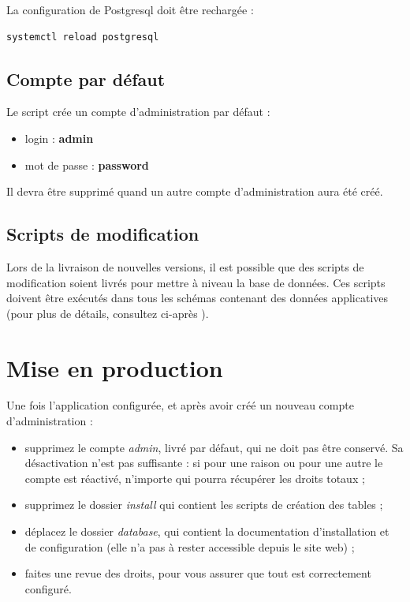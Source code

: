 La configuration de Postgresql doit être rechargée :
\begin{lstlisting}
systemctl reload postgresql
\end{lstlisting}

\subsection{Compte par défaut}
Le script crée un compte d'administration par défaut :
\begin{itemize}
\item login : \textbf{admin}
\item mot de passe : \textbf{password}
\end{itemize}

Il devra être supprimé quand un autre compte d'administration aura été créé.

\subsection{Scripts de modification}

Lors de la livraison de nouvelles versions, il est possible que des scripts de modification soient livrés pour mettre à niveau la base de données. Ces scripts doivent être exécutés dans tous les schémas contenant des données applicatives (pour plus de détails, consultez ci-après \textit{}).

\section{Mise en production}

Une fois l'application configurée, et après avoir créé un nouveau compte d'administration :
\begin{itemize}
\item supprimez le compte \textit{admin}, livré par défaut, qui ne doit pas être conservé. Sa désactivation n'est pas suffisante : si pour une raison ou pour une autre le compte est réactivé, n'importe qui pourra récupérer les droits totaux ;
\item supprimez le dossier \textit{install} qui contient les scripts de création des tables ;
\item déplacez le dossier \textit{database}, qui contient la documentation d'installation et de configuration (elle n'a pas à rester accessible depuis le site web) ;
\item faites une revue des droits, pour vous assurer que tout est correctement configuré.
\end{itemize}

